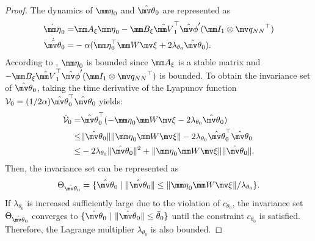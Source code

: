 \documentclass[letterpaper, 10 pt, conference]{ieeeconf}  %
\begin{document}
\begin{proof}
The dynamics of ${\mm \eta}_0$ and ${\hat{\mv\theta}}_0$ are represented as
\begin{equation}
    \begin{aligned}     
        \dot{\mm \eta}_0 =& 
        \mm A_\xi{\mm \eta}_0 -\mm B_\xi 
        \hat {\mm V}_1^\top \hat{\mv\phi}'(\mm I_1\otimes {\mv q_{NN}}^\top )
        \\
        \dot{{\hat{\mv\theta}}}_0
        =&
        -\alpha 
        (
            {\mm \eta}_0^\top \mm W\mv \xi+2\lambda_{\theta_0} {\hat{\mv\theta}}_0
        )
        .
    \end{aligned}
\end{equation}
According to \cite[Chap.~4 T.~1.9]{RN32}, ${\mm \eta}_0$ is bounded since $\mm A_\xi$ is a stable matrix and $-\mm B_\xi\hat {\mm V}_1^\top \hat{\mv\phi}'(\mm I_1\otimes {\mv q_{NN}}^\top )$ is bounded.
To obtain the invariance set of ${\hat{\mv\theta}}_0$, taking the time derivative of the Lyapunov function $\mathcal V_0=(1/2\alpha){\hat{\mv\theta}}_0^\top {\hat{\mv\theta}}_0$ yields:
\begin{equation}
    \begin{aligned}
        \dot {\mathcal V}_0 =& 
        {\hat{\mv\theta}}_0^\top (-{\mm \eta}_0\mm W\mv \xi -2\lambda_{\theta_0}{\hat{\mv\theta}}_0)
        \\
        \le &
        \Vert{\hat{\mv\theta}}_0\Vert \Vert {\mm \eta}_0\mm W\mv \xi\Vert -2\lambda_{\theta_0} {\hat{\mv\theta}}_0^\top {\hat{\mv\theta}}_0
        \\
        \le &
        -2\lambda_{\theta_0} \Vert{\hat{\mv\theta}}_0\Vert^2 + \Vert {\mm \eta}_0\mm W\mv \xi\Vert \Vert {\hat{\mv\theta}}_0\Vert 
        .
    \end{aligned}
\end{equation}
Then, the invariance set can be represented as 
\begin{equation}
    \Theta_{{\hat{\mv\theta}}_0} =
    \{
        {\hat{\mv\theta}}_0\mid\Vert{\hat{\mv\theta}}_0\Vert 
        \le
        \Vert{\mm \eta}_0\mm W\mv \xi\Vert/\lambda_{\theta_0}
    \}
    .    
\end{equation}
If $\lambda_{\theta_0}$ is increased sufficiently large due to the violation of $c_{\theta_0}$, the invariance set $\Theta_{{\hat{\mv\theta}}_0}$ converges to $\{{\hat{\mv\theta}}_0\ \vert \ \Vert{\hat{\mv\theta}}_0\Vert \le \bar\theta_0\}$ until the constraint $c_{\theta_0}$ is satisfied.
Therefore, the Lagrange multiplier $\lambda_{\theta_0}$ is also bounded.

\end{proof}
\end{document}
